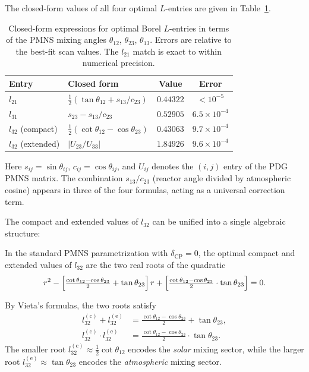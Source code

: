 \documentclass[epjc3]{svjour3}
\begin{document}
The closed-form values of all four optimal $L$-entries are
given in Table~\ref{tab:closed_form}.
 
\begin{table}[h]
\centering
\caption{Closed-form expressions for optimal Borel $L$-entries
in terms of the PMNS mixing angles
$\theta_{12}$, $\theta_{23}$, $\theta_{13}$.
Errors are relative to the best-fit scan values.
The $l_{21}$ match is exact to within numerical precision.}
\label{tab:closed_form}
\begin{tabular}{llcc}
\toprule
Entry & Closed form & Value & Error \\
\midrule
$l_{21}$          & $\tfrac{1}{2}(\tan\theta_{12} + s_{13}/c_{23})$
                  & $0.44322$ & $<10^{-5}$ \\
$l_{31}$          & $s_{23} - s_{13}/c_{23}$
                  & $0.52905$ & $6.5\times10^{-4}$ \\
$l_{32}$ (compact)  & $\tfrac{1}{2}(\cot\theta_{12} - \cos\theta_{23})$
                  & $0.43063$ & $9.7\times10^{-4}$ \\
$l_{32}$ (extended) & $|U_{23}/U_{33}|$
                  & $1.84926$ & $9.6\times10^{-4}$ \\
\bottomrule
\end{tabular}
\end{table}
 
\noindent
Here $s_{ij} = \sin\theta_{ij}$, $c_{ij} = \cos\theta_{ij}$,
and $U_{ij}$ denotes the $(i,j)$ entry of the PDG PMNS matrix.
The combination $s_{13}/c_{23}$ (reactor angle divided by
atmospheric cosine) appears in three of the four formulas,
acting as a universal correction term.
 
The compact and extended values of $l_{32}$ can be unified into a
single algebraic structure:
 
\begin{proposition}
\label{prop:quadratic}
In the standard PMNS parametrization with $\delta_{\mathrm{CP}} = 0$,
the optimal compact and extended values of $l_{32}$ are the two
real roots of the quadratic
\begin{equation}
\label{eq:quadratic}
r^2 - \Bigl[\tfrac{\cot\theta_{12} - \cos\theta_{23}}{2}
            + \tan\theta_{23}\Bigr]\,r
     + \Bigl[\tfrac{\cot\theta_{12} - \cos\theta_{23}}{2}
             \cdot \tan\theta_{23}\Bigr] = 0.
\end{equation}

By Vieta's formulas, the two roots satisfy
\begin{align}
l_{32}^{(\mathrm{c})} + l_{32}^{(\mathrm{e})}
  &= \tfrac{\cot\theta_{12} - \cos\theta_{23}}{2} + \tan\theta_{23},
  \label{eq:vieta_sum}\\
l_{32}^{(\mathrm{c})} \cdot l_{32}^{(\mathrm{e})}
  &= \tfrac{\cot\theta_{12} - \cos\theta_{23}}{2} \cdot \tan\theta_{23}.
  \label{eq:vieta_product}
\end{align}
The smaller root $l_{32}^{(\mathrm{c})} \approx \tfrac{1}{2}\cot\theta_{12}$
encodes the \emph{solar} mixing sector, while the larger root
$l_{32}^{(\mathrm{e})} \approx \tan\theta_{23}$ encodes the
\emph{atmospheric} mixing sector.
\end{proposition}
 
\end{document}
